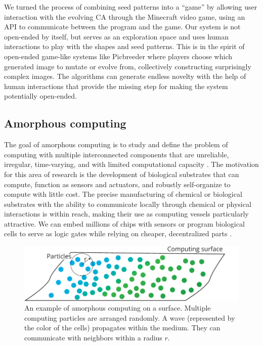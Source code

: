 We turned the process of combining seed patterns into a ``game'' by allowing user
interaction with the evolving CA through the Minecraft video game, using an API
to communicate between the program and the game. Our system is not open-ended by
itself, but serves as an exploration space and uses human interactions to play
with the shapes and seed patterns. This is in the spirit of open-ended game-like
systems like Picbreeder \parencite{secretanPicbreederCaseStudy2011,
  woolleyDeleteriousEffectsPriori2011} where players choose which generated
image to mutate or evolve from, collectively constructing surprisingly complex
images. The algorithms can generate endless novelty with the help of human
interactions that provide the missing step for making the system potentially
open-ended.

\subsection{Amorphous computing}
The goal of amorphous computing is to study and define the problem of computing
with multiple interconnected components that are unreliable, irregular,
time-varying, and with limited computational capacity
\parencite{abelsonAmorphousComputing2000}. The motivation for this area of
research is the development of biological substrates that can compute, function
as sensors and actuators, and robustly self-organize to compute with little
cost. The precise manufacturing of chemical or biological substrates with the ability
to communicate locally through chemical or physical interactions is within
reach, making their use as computing vessels particularly
attractive. We can embed millions of chips with sensors
\parencite{abelsonAmorphousComputing2000} or program biological cells to serve
as logic gates \parencite{weissProgrammingBiologicalCells1998,
  weissVivoDigitalCircuits2002} while relying on cheaper, decentralized parts
\parencite{buteraProgrammingPaintableComputer2002}.

\begin{figure}[htbp]
  \centering
  \includegraphics[width=.8\linewidth]{figures/amorphous_computing}
  \caption{An example of amorphous computing on a surface. Multiple computing
    particles are arranged randomly. A wave (represented by the color of the
    cells) propagates within the medium. They can communicate with neighbors
    within a radius $r$.}
  \label{fig:amorphous_computing}
\end{figure}

